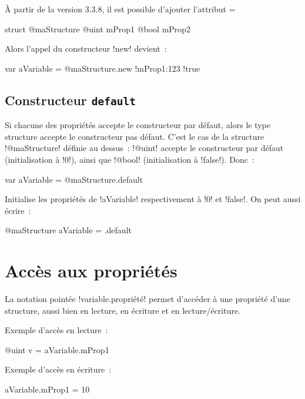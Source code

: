 À partir de la version 3.3.8, il est possible d'ajouter l'attribut \ggst=%
\begin{galgas3}
struct @maStructure {
  @uint mProp1 %
  @bool mProp2
}
\end{galgas3}

Alors l'appel du constructeur \ggst!new! devient~:
\begin{galgas3}
var aVariable = @maStructure.new {!mProp1:123 !true}
\end{galgas3}


\subsection{Constructeur \texttt{default}}

Si chacune des propriétés accepte le constructeur par défaut, alors le type structure accepte le constructeur pas défaut. C'est le cas de la structure \ggst!@maStructure! définie au dessus~: \ggst!@uint! accepte le constructeur par défaut (initialisation à \ggst!0!), ainsi que \ggst!@bool! (initialisation à \ggst!false!). Donc~:
\begin{galgas3}
var aVariable = @maStructure.default
\end{galgas3}
Initialise les propriétés de \ggst!aVariable! respectivement à \ggst!0! et \ggst!false!. On peut aussi écrire~:
\begin{galgas3}
@maStructure aVariable = .default
\end{galgas3}


\section{Accès aux propriétés}

La notation pointée \ggst!variable.propriété! permet d'accéder à une propriété d'une structure, aussi bien en lecture, en écriture et en lecture/écriture.

Exemple d'accès en lecture~:
\begin{galgas3}
@uint v = aVariable.mProp1
\end{galgas3}

Exemple d'accès en écriture~:
\begin{galgas3}
aVariable.mProp1 = 10
\end{galgas3}


